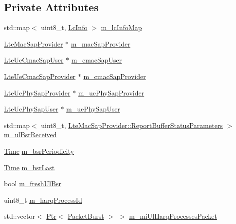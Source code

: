 \subsection*{Private Attributes}
\begin{DoxyCompactItemize}
\item 
std\+::map$<$ uint8\+\_\+t, \hyperlink{structns3_1_1LteUeMac_1_1LcInfo}{Lc\+Info} $>$ \hyperlink{classns3_1_1LteUeMac_af4d5b382d725f5e2fbf18dcdb60401ed}{m\+\_\+lc\+Info\+Map}
\item 
\hyperlink{classns3_1_1LteMacSapProvider}{Lte\+Mac\+Sap\+Provider} $\ast$ \hyperlink{classns3_1_1LteUeMac_adce91277155c23716dca4726844748f9}{m\+\_\+mac\+Sap\+Provider}
\item 
\hyperlink{classns3_1_1LteUeCmacSapUser}{Lte\+Ue\+Cmac\+Sap\+User} $\ast$ \hyperlink{classns3_1_1LteUeMac_ac4ed6a7b40912e92cf93c79e36807b8d}{m\+\_\+cmac\+Sap\+User}
\item 
\hyperlink{classns3_1_1LteUeCmacSapProvider}{Lte\+Ue\+Cmac\+Sap\+Provider} $\ast$ \hyperlink{classns3_1_1LteUeMac_a57844092e81ef266986bdd2e9cde67ad}{m\+\_\+cmac\+Sap\+Provider}
\item 
\hyperlink{classns3_1_1LteUePhySapProvider}{Lte\+Ue\+Phy\+Sap\+Provider} $\ast$ \hyperlink{classns3_1_1LteUeMac_a3189de2e0656b4e918c1302f7f68a007}{m\+\_\+ue\+Phy\+Sap\+Provider}
\item 
\hyperlink{classns3_1_1LteUePhySapUser}{Lte\+Ue\+Phy\+Sap\+User} $\ast$ \hyperlink{classns3_1_1LteUeMac_a0a82d69ceccdff5053c6b7984032d19f}{m\+\_\+ue\+Phy\+Sap\+User}
\item 
std\+::map$<$ uint8\+\_\+t, \hyperlink{structns3_1_1LteMacSapProvider_1_1ReportBufferStatusParameters}{Lte\+Mac\+Sap\+Provider\+::\+Report\+Buffer\+Status\+Parameters} $>$ \hyperlink{classns3_1_1LteUeMac_ab1de37ecba7b76c9de1dd81bf49ac66d}{m\+\_\+ul\+Bsr\+Received}
\item 
\hyperlink{classns3_1_1Time}{Time} \hyperlink{classns3_1_1LteUeMac_a3cb9297a85b7412d908676bec6f5ceab}{m\+\_\+bsr\+Periodicity}
\item 
\hyperlink{classns3_1_1Time}{Time} \hyperlink{classns3_1_1LteUeMac_a87b21ada2d90060b213d64699e698d65}{m\+\_\+bsr\+Last}
\item 
bool \hyperlink{classns3_1_1LteUeMac_aca794e82bda10d6cdd9e5ffbbb7b11bc}{m\+\_\+fresh\+Ul\+Bsr}
\item 
uint8\+\_\+t \hyperlink{classns3_1_1LteUeMac_ad7b724012bfa1d25bd750f40a66a1aaf}{m\+\_\+harq\+Process\+Id}
\item 
std\+::vector$<$ \hyperlink{classns3_1_1Ptr}{Ptr}$<$ \hyperlink{classns3_1_1PacketBurst}{Packet\+Burst} $>$ $>$ \hyperlink{classns3_1_1LteUeMac_af895ce47f438d39c2753740352120c45}{m\+\_\+mi\+Ul\+Harq\+Processes\+Packet}

\end{DoxyCompactItemize}
